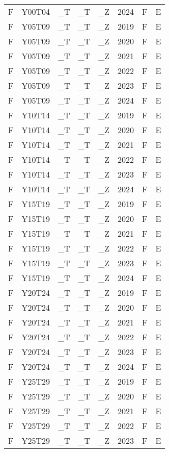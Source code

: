 \begin{longtable}[t]{llllllll}
F & Y00T04 & \_T & \_T & \_Z & 2024 & F & E\\
F & Y05T09 & \_T & \_T & \_Z & 2019 & F & E\\
F & Y05T09 & \_T & \_T & \_Z & 2020 & F & E\\
\addlinespace
F & Y05T09 & \_T & \_T & \_Z & 2021 & F & E\\
F & Y05T09 & \_T & \_T & \_Z & 2022 & F & E\\
F & Y05T09 & \_T & \_T & \_Z & 2023 & F & E\\
F & Y05T09 & \_T & \_T & \_Z & 2024 & F & E\\
F & Y10T14 & \_T & \_T & \_Z & 2019 & F & E\\
\addlinespace
F & Y10T14 & \_T & \_T & \_Z & 2020 & F & E\\
F & Y10T14 & \_T & \_T & \_Z & 2021 & F & E\\
F & Y10T14 & \_T & \_T & \_Z & 2022 & F & E\\
F & Y10T14 & \_T & \_T & \_Z & 2023 & F & E\\
F & Y10T14 & \_T & \_T & \_Z & 2024 & F & E\\
\addlinespace
F & Y15T19 & \_T & \_T & \_Z & 2019 & F & E\\
F & Y15T19 & \_T & \_T & \_Z & 2020 & F & E\\
F & Y15T19 & \_T & \_T & \_Z & 2021 & F & E\\
F & Y15T19 & \_T & \_T & \_Z & 2022 & F & E\\
F & Y15T19 & \_T & \_T & \_Z & 2023 & F & E\\
\addlinespace
F & Y15T19 & \_T & \_T & \_Z & 2024 & F & E\\
F & Y20T24 & \_T & \_T & \_Z & 2019 & F & E\\
F & Y20T24 & \_T & \_T & \_Z & 2020 & F & E\\
F & Y20T24 & \_T & \_T & \_Z & 2021 & F & E\\
F & Y20T24 & \_T & \_T & \_Z & 2022 & F & E\\
\addlinespace
F & Y20T24 & \_T & \_T & \_Z & 2023 & F & E\\
F & Y20T24 & \_T & \_T & \_Z & 2024 & F & E\\
F & Y25T29 & \_T & \_T & \_Z & 2019 & F & E\\
F & Y25T29 & \_T & \_T & \_Z & 2020 & F & E\\
F & Y25T29 & \_T & \_T & \_Z & 2021 & F & E\\
\addlinespace
F & Y25T29 & \_T & \_T & \_Z & 2022 & F & E\\
F & Y25T29 & \_T & \_T & \_Z & 2023 & F & E\\

\end{longtable}
